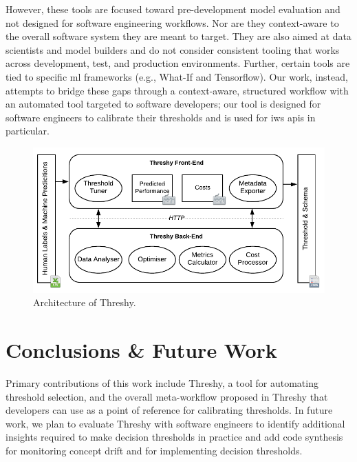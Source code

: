 However, these tools are focused toward pre-development model evaluation and not designed for software engineering workflows. Nor are they context-aware to the overall software system they are meant to target. They are also aimed at data scientists and model builders and do not consider consistent tooling that works across development, test, and production environments. Further, certain tools are tied to specific \gls{ml} frameworks (e.g., What-If and Tensorflow). Our work, instead, attempts to bridge these gaps through a context-aware, structured workflow with an automated tool targeted to software developers; our tool is designed for software engineers to calibrate their thresholds and is used for \gls{iws} \glspl{api} in particular.%

\begin{figure}[t!]
    \centering
    \includegraphics[width=.8\linewidth]{architecture.pdf}
    \caption[Architecture of Threshy]{Architecture of Threshy.}
    \label{fse-demo2020:fig:implementation}
\end{figure}

\section{Conclusions \& Future Work}
\label{fse-demo2020:sec:conclusion}

Primary contributions of this work include Threshy, a tool for automating threshold selection, and the overall meta-workflow proposed in Threshy that developers can use as a point of reference for calibrating thresholds. In future work, we plan to evaluate Threshy with software engineers to identify additional insights required to make decision thresholds in practice and add code synthesis for monitoring concept drift and for implementing decision thresholds.
